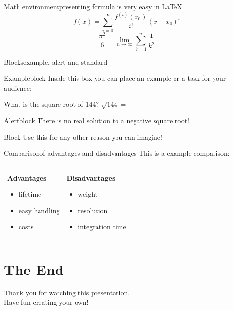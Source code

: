 \documentclass[	12pt, 				
				t,					
				aspectratio=169]{beamer}
\begin{document}
	
	
	\begin{frame}{Math environment}{presenting formula is very easy in \LaTeX}
		\vfill
		\begin{equation*}
			f(x)=\sum_{i=0}^\infty \frac{f^{(i)}(x_0)}{i!}(x-x_0)^i
		\end{equation*}
		\vfill
		\begin{equation*}
			\displaystyle\frac{\pi^2}{6}=\lim_{n \to \infty}\sum_{k=1}^n \frac{1}{k^2}
		\end{equation*}
		\vfill
	\end{frame}
	
	
	\begin{frame}{Blocks}{example, alert and standard}
	    \begin{exampleblock}{Exampleblock}
			Inside this box you can place an example or a task for your audience:
			
			What is the square root of 144? $\sqrt{144} = $
		\end{exampleblock}
		\begin{alertblock}{Alertblock}			
			There is no real solution to a negative square root!
		\end{alertblock}
		\begin{block}{Block}
			Use this for any other reason you can imagine!
		\end{block}
	\end{frame}
	
	
	\begin{frame}{Comparison}{of advantages and disadvantages}
		This is a example comparison:
		\begin{center}
		\begin{tabularx}{0.8\textwidth}{X|X}
			\textbf{Advantages}
			 \begin{itemize}[<2->]
			 	\item lifetime
			 	\item easy handling
			 	\item costs
			 \end{itemize} &
			\textbf{Disadvantages}
			 \begin{itemize}[<3->]
			 	\item weight
			 	\item resolution
			 	\item integration time
			 \end{itemize}
		\end{tabularx}
		\end{center}
	\end{frame}
	
		
	\section*{The End}
	\begin{frame}
		\vspace{2.2cm}
		\begin{center}
			\huge Thank you for watching this presentation.\\
			Have fun creating your own!
		\end{center}
		\vfill
	\end{frame}
	
\end{document}
